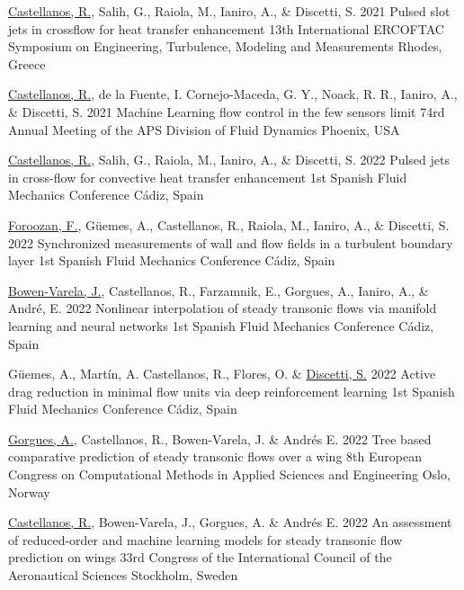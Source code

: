 	\conferenceitem%
		{\underline{Castellanos, R.}, Salih, G., Raiola, M., Ianiro, A., \& Discetti, S.}%
		{2021}%
		{Pulsed slot jets in crossflow for heat transfer enhancement}%
    {13th International ERCOFTAC Symposium on Engineering, Turbulence, Modeling and Measurements}%
    {Rhodes, Greece}%

	\conferenceitem%
		{\underline{Castellanos, R.}, de la Fuente, I. Cornejo-Maceda, G. Y., Noack, R. R., Ianiro, A., \& Discetti, S.}%
		{2021}%
		{Machine Learning flow control in the few sensors limit}%
    {74rd Annual Meeting of the APS Division of Fluid Dynamics}%
    {Phoenix, USA}%

	\conferenceitem%
		{\underline{Castellanos, R.}, Salih, G., Raiola, M., Ianiro, A., \& Discetti, S.}%
		{2022}%
		{Pulsed jets in cross-flow for convective heat transfer enhancement}%
    {1st Spanish Fluid Mechanics Conference}%
    {C\'{a}diz, Spain}%

	\conferenceitem%
		{\underline{Foroozan, F.}, Güemes, A., Castellanos, R., Raiola, M., Ianiro, A., \& Discetti, S.}%
		{2022}%
		{Synchronized measurements of wall and flow fields in a turbulent boundary layer}%
    {1st Spanish Fluid Mechanics Conference}%
    {C\'{a}diz, Spain}%

	\conferenceitem%
		{\underline{Bowen-Varela, J.}, Castellanos, R., Farzamnik, E., Gorgues, A., Ianiro, A., \& Andr\'{e}, E.}%
		{2022}%
		{Nonlinear interpolation of steady transonic flows via manifold learning and neural
networks}%
    {1st Spanish Fluid Mechanics Conference}%
    {C\'{a}diz, Spain}%

	\conferenceitem%
		{Güemes, A., Mart\'{i}n, A. Castellanos, R., Flores, O. \& \underline{Discetti, S.}}%
		{2022}%
		{Active drag reduction in minimal flow units via deep reinforcement learning}%
    {1st Spanish Fluid Mechanics Conference}%
    {C\'{a}diz, Spain}%

	\conferenceitem%
		{\underline{Gorgues, A.}, Castellanos, R., Bowen-Varela, J. \& Andr\'{e}s E.}%
		{2022}%
		{Tree based comparative prediction of steady transonic flows over a wing}%
    {8th European Congress on Computational Methods in Applied Sciences and Engineering}%
    {Oslo, Norway}%

	\conferenceitem%
		{\underline{Castellanos, R.}, Bowen-Varela, J., Gorgues, A. \& Andr\'{e}s E.}%
		{2022}%
		{An assessment of reduced-order and machine learning models for steady transonic flow prediction on wings}%
    {33rd Congress of the International Council of the Aeronautical Sciences}%
    {Stockholm, Sweden}%